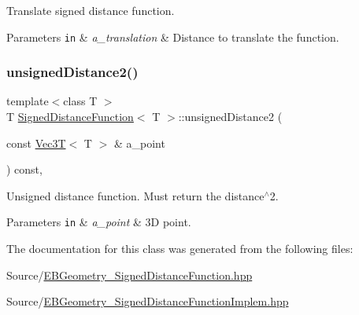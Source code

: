 Translate signed distance function. 


\begin{DoxyParams}[1]{Parameters}
\mbox{\tt in}  & {\em a\+\_\+translation} & Distance to translate the function. \\
\hline
\end{DoxyParams}
\mbox{\label{classSignedDistanceFunction_a2a3e72186725a4e931db0f8d4895bcb8}} 
\subsubsection{\texorpdfstring{unsigned\+Distance2()}{unsignedDistance2()}}
{\footnotesize\ttfamily template$<$class T $>$ \\
T \hyperlink{classSignedDistanceFunction}{Signed\+Distance\+Function}$<$ T $>$\+::unsigned\+Distance2 (\begin{DoxyParamCaption}\item[{const \hyperlink{classVec3T}{Vec3T}$<$ T $>$ \&}]{a\+\_\+point }\end{DoxyParamCaption}) const\hspace{0.3cm}{\ttfamily [virtual]}, {\ttfamily [noexcept]}}



Unsigned distance function. Must return the distance$^\wedge$2. 


\begin{DoxyParams}[1]{Parameters}
\mbox{\tt in}  & {\em a\+\_\+point} & 3D point. \\
\hline
\end{DoxyParams}


The documentation for this class was generated from the following files\+:\begin{DoxyCompactItemize}
\item 
Source/\hyperlink{EBGeometry__SignedDistanceFunction_8hpp}{E\+B\+Geometry\+\_\+\+Signed\+Distance\+Function.\+hpp}\item 
Source/\hyperlink{EBGeometry__SignedDistanceFunctionImplem_8hpp}{E\+B\+Geometry\+\_\+\+Signed\+Distance\+Function\+Implem.\+hpp}\end{DoxyCompactItemize}
